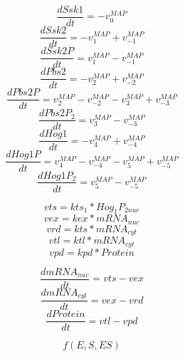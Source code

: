\documentclass[11pt]{amsart}
\begin{document}
\[\frac{dSsk1}{dt} = -v_0^{MAP}\]
\[\frac{dSsk2}{dt} = -v_1^{MAP} + v_{-1}^{MAP} \]
\[\frac{dSsk2P}{dt} = v_1^{MAP} - v_{-1}^{MAP} \]
\[\frac{dPbs2}{dt} = -v_2^{MAP} + v_{-2}^{MAP}\]
\[\frac{dPbs2P}{dt} = v_2^{MAP} - v_{-2}^{MAP} - v_3^{MAP} + v_{-3}^{MAP}\]
\[\frac{dPbs2P_2}{dt} = v_3^{MAP} - v_{-3}^{MAP} \]
\[\frac{dHog1}{dt} = -v_4^{MAP} + v_{-4}^{MAP}\]
\[\frac{dHog1P}{dt} = v_4^{MAP} - v_{-4}^{MAP} - v_{5}^{MAP} + v_{-5}^{MAP} \]
\[\frac{dHog1P_2}{dt} =  v_{5}^{MAP} - v_{-5}^{MAP}\]

\clearpage

\[vts = kts_1*Hog_1P_{2nuc}\]
\[vex = kex*mRNA_{nuc}\]
\[vrd = kts*mRNA_{cyt}\]
\[vtl = ktl*mRNA_{cyt}\]
\[vpd = kpd*Protein\]


\[\frac{dmRNA_{nuc}}{dt} = vts - vex\]
\[\frac{dmRNA_{cyt}}{dt} = vex - vrd\]
\[\frac{dProtein}{dt} = vtl - vpd\]

\[f(E, S, ES)\]
\end{document}
